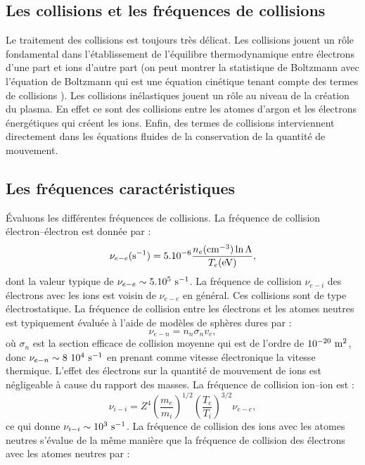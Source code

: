 \documentclass{book}
\begin{document}
\subsection{Les collisions et les fr\'equences de collisions}
Le traitement des collisions est toujours tr\`es d\'elicat. Les
collisions jouent un r\^ole fondamental dans l'\'etablissement de
l'\'equilibre thermodynamique entre \'electrons d'une part et ions d'autre
part (on peut montrer la statistique de 
Boltzmann avec l'\'equation de
Boltzmann
 qui est une \'equation cin\'etique tenant compte des termes de
collisions \cite{Diu89}).
Les collisions in\'elastiques jouent un r\^ole au niveau de la
cr\'eation du 
plasma. En effet ce sont des collisions entre les atomes d'argon et
les \'electrons \'energ\'etiques qui cr\'eent les ions.
Enfin, des termes de collisions interviennent directement dans les
\'equations fluides de la conservation 
 de la quantit\'e de mouvement.


\subsection{Les fr\'equences caract\'eristiques}
\'Evaluons les diff\'erentes fr\'equences de collisions.
La fr\'equence de collision \'electron--\'electron est donn\'ee par 
\cite{Chen84} :
\begin{equation}
\nu_{e-e}({\rm s^{-1}})=5.10^{-6} \frac{n_e({\rm
cm}^{-3})\ln{\Lambda}}{T_e({\rm eV})},
\end{equation}
dont la valeur typique de $\nu_{e-e}\sim 5.10^5\ {\rm s}^{-1}$.
La fr\'equence de collision $\nu_{e-i}$ des \'electrons avec les ions est
voisin de $\nu_{e-e}$ en g\'en\'eral. Ces collisions sont de type
\'electrostatique. 
La fr\'equence de collision entre les \'electrons et les atomes
neutres est 
typiquement \'evalu\'ee \`a l'aide de mod\`eles de sph\`eres dures par :
\begin{equation}
\nu_{e- n}=n_n\sigma_n v_e,
\end{equation}
o\`u $\sigma_n$ est 
la section efficace de collision moyenne qui est de l'ordre de
$10^{-20}\ {\rm m}^2$, donc $\nu_{e- n}\sim 8\ 10^{4}\ {\rm s}^{-1}$ en
prenant comme vitesse \'electronique la vitesse thermique.
L'effet des \'electrons sur la quantit\'e de mouvement de ions est
n\'egligeable \`a cause du rapport des masses.
La fr\'equence de collision ion--ion est \cite{Chen84} :
\begin{equation}
\nu_{i- i}=Z^4(\frac{m_e}{m_i})^{1/2}(\frac{T_e}{T_i})^{3/2}\nu_{e- e},
\end{equation}
ce qui donne $\nu_{i- i}\sim 10^3\ {\rm s}^{-1}$.
La fr\'equence de collision  des ions avec les atomes neutres s'\'evalue de la
m\^eme mani\`ere que la fr\'equence de collision des \'electrons avec les
atomes neutres par :
\end{document}
